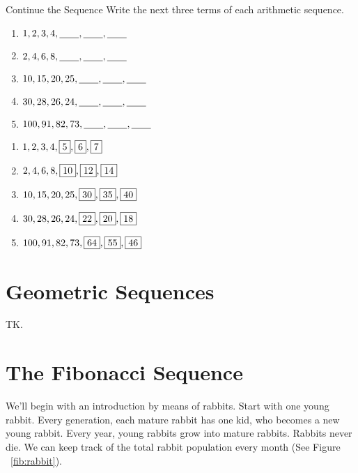 \documentclass[a4paper,10pt]{report}
\begin{document}
\begin{problem}{Continue the Sequence}
  Write the next three terms of each arithmetic sequence.

  \begin{enumerate}
  \item \(1, 2, 3, 4, \underline{\hspace{2em}}, \underline{\hspace{2em}}, \underline{\hspace{2em}}\)
  \item \(2, 4, 6, 8, \underline{\hspace{2em}}, \underline{\hspace{2em}}, \underline{\hspace{2em}}\)
  \item \(10, 15, 20, 25, \underline{\hspace{2em}}, \underline{\hspace{2em}}, \underline{\hspace{2em}}\)
  \item \(30, 28, 26, 24, \underline{\hspace{2em}}, \underline{\hspace{2em}}, \underline{\hspace{2em}}\)
  \item \(100, 91, 82, 73, \underline{\hspace{2em}}, \underline{\hspace{2em}}, \underline{\hspace{2em}}\)
  \end{enumerate}

  \begin{solution}
    \begin{enumerate}
    \item \(1, 2, 3, 4, \Ans{5}, \Ans{6}, \Ans{7}\)
    \item \(2, 4, 6, 8, \Ans{10}, \Ans{12}, \Ans{14}\)
    \item \(10, 15, 20, 25, \Ans{30}, \Ans{35}, \Ans{40}\)
    \item \(30, 28, 26, 24, \Ans{22}, \Ans{20}, \Ans{18}\)
    \item \(100, 91, 82, 73, \Ans{64}, \Ans{55}, \Ans{46}\)
    \end{enumerate}
  \end{solution}
\end{problem}

\chapter{Geometric Sequences}

TK.

\chapter{The Fibonacci Sequence}

We'll begin with an introduction by means of rabbits. Start with one young
rabbit. Every generation, each mature rabbit has one kid, who becomes a new
young rabbit. Every year, young rabbits grow into mature rabbits. Rabbits never
die. We can keep track of the total rabbit population every month (See Figure
~\ref{fib:rabbit}).
\end{document}
